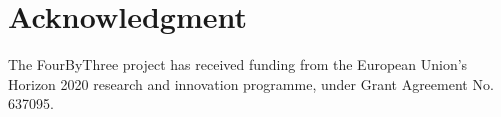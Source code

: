 \section{Acknowledgment}
The FourByThree project has received funding from the European Union's Horizon 2020 research and innovation programme, under Grant Agreement No. 637095.


